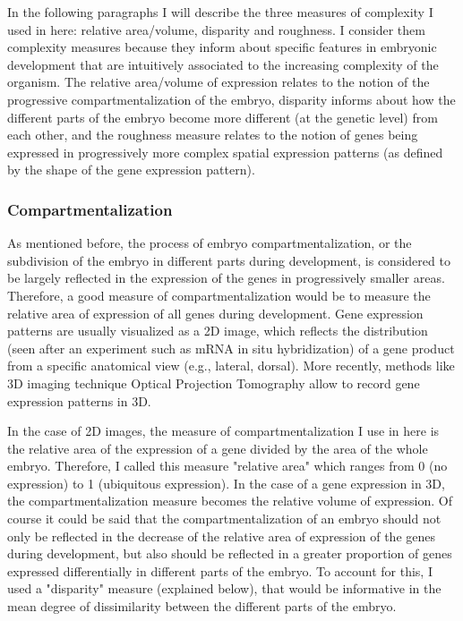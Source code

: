 
In the following paragraphs I will describe the three measures of complexity I used in here: relative area/volume, disparity and roughness. I consider them complexity measures because they inform about specific features in embryonic development that are intuitively associated to the increasing complexity of the organism. The relative area/volume of expression relates to the notion of the progressive compartmentalization of the embryo, disparity informs about how the different parts of the embryo become more different (at the genetic level) from each other, and the roughness measure relates to the notion of genes being expressed in progressively more complex spatial expression patterns (as defined by the shape of the gene expression pattern).


\subsubsection{Compartmentalization}

As mentioned before, the process of embryo compartmentalization, or the subdivision of the embryo in different parts during development, is considered to be largely reflected in the expression of the genes in progressively smaller areas. Therefore, a good measure of compartmentalization would be to measure the relative area of expression of all genes during development. Gene expression patterns are usually visualized as a 2D image, which reflects the distribution (seen after an experiment such as mRNA in situ hybridization) of a gene product from a specific anatomical view (e.g., lateral, dorsal).  More recently, methods like 3D imaging technique Optical Projection Tomography  \citep{Sharpe2003,Summerhurst2008} allow to record gene expression patterns in 3D. 

In the case of 2D images, the measure of compartmentalization I use in here is the relative area of the expression of a gene divided by the area of the whole embryo. Therefore, I called this measure "relative area" which ranges from 0 (no expression) to 1 (ubiquitous expression). In the case of a gene expression in 3D, the compartmentalization measure becomes the relative volume of expression.
Of course it could be said that the compartmentalization of an embryo should not only be reflected in the decrease of the relative area of expression of the genes during development, but also should be reflected in a greater proportion of genes expressed differentially in different parts of the embryo. To account for this, I used a "disparity" measure (explained below), that would be informative in the mean degree of dissimilarity between the different parts of the embryo.

